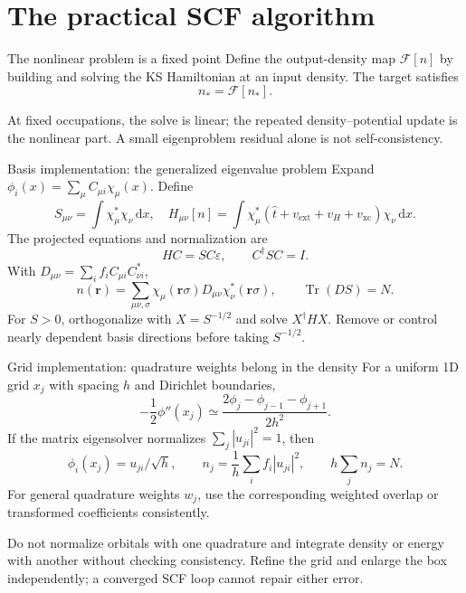 \documentclass[aspectratio=169,10pt]{beamer}
\newcommand{\warnbox}[1]{\begin{tcolorbox}[colback=palewarm,colframe=warm,title={A trap to avoid}]#1\end{tcolorbox}}
\newcommand{\dd}{\,\mathrm d}
\newcommand{\rr}{\mathbf r}
\newcommand{\Tr}{\operatorname{Tr}}
\newcommand{\ext}{\mathrm{ext}}
\newcommand{\xc}{\mathrm{xc}}
\newcommand{\inp}{\mathrm{in}}
\newcommand{\out}{\mathrm{out}}
\begin{document}
\section{The practical SCF algorithm}
\begin{frame}{The nonlinear problem is a fixed point}
Define the output-density map $\mathcal F[n]$ by building and solving
the KS Hamiltonian at an input density. The target satisfies
\[
 \boxed{n_* = \mathcal F[n_*].}
\]
\begin{center}
\end{center}
\vspace{3mm}
At fixed occupations, the solve is linear; the repeated density--potential
update is the nonlinear part. A small eigenproblem residual alone is not
self-consistency.
\end{frame}

\begin{frame}{Basis implementation: the generalized eigenvalue problem}
Expand $\phi_i(x)=\sum_\mu C_{\mu i}\chi_\mu(x)$. Define
\[
 S_{\mu\nu}=\int\chi_\mu^*\chi_\nu\dd x,\quad
 H_{\mu\nu}[n]=\int\chi_\mu^*(\hat t+v_{\ext}+v_H+v_{\xc})\chi_\nu\dd x.
\]
The projected equations and normalization are
\[
 \boxed{H C=S C\varepsilon,\qquad C^\dagger S C=I.}
\]
With $D_{\mu\nu}=\sum_i f_i C_{\mu i}C_{\nu i}^*$,
\[
 n(\rr)=\sum_{\mu\nu,\sigma}\chi_\mu(\rr\sigma)D_{\mu\nu}
                            \chi_\nu^*(\rr\sigma),\qquad \Tr(DS)=N.
\]
For $S>0$, orthogonalize with $X=S^{-1/2}$ and solve $X^\dagger H X$.
Remove or control nearly dependent basis directions before taking $S^{-1/2}$.
\end{frame}

\begin{frame}{Grid implementation: quadrature weights belong in the density}
For a uniform 1D grid $x_j$ with spacing $h$ and Dirichlet boundaries,
\[
 -\frac12\phi''(x_j)\simeq
 \frac{2\phi_j-\phi_{j-1}-\phi_{j+1}}{2h^2}.
\]
If the matrix eigensolver normalizes $\sum_j|u_{ji}|^2=1$, then
\[
 \phi_i(x_j)=u_{ji}/\sqrt h,\qquad
 n_j=\frac1h\sum_i f_i|u_{ji}|^2,\qquad h\sum_j n_j=N.
\]
For general quadrature weights $w_j$, use the corresponding weighted overlap
or transformed coefficients consistently.
\warnbox{Do not normalize orbitals with one quadrature and integrate density
or energy with another without checking consistency. Refine the grid and
enlarge the box independently; a converged SCF loop cannot repair either error.}
\end{frame}
\end{document}
